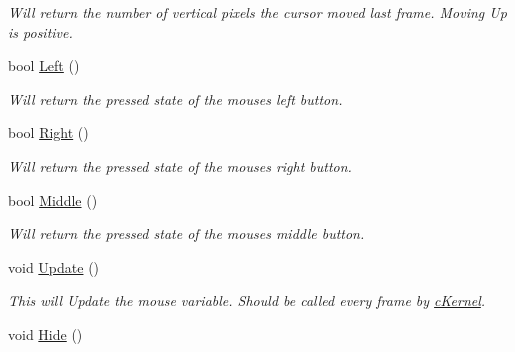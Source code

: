 \begin{DoxyCompactItemize}
\begin{DoxyCompactList}\small\item\em Will return the number of vertical pixels the cursor moved last frame. Moving Up is positive. \end{DoxyCompactList}\item 
\hypertarget{classc_mouse_a0f6cd75cafc7c7ff7f00947e2f98b092}{
bool \hyperlink{classc_mouse_a0f6cd75cafc7c7ff7f00947e2f98b092}{Left} ()}
\label{classc_mouse_a0f6cd75cafc7c7ff7f00947e2f98b092}

\begin{DoxyCompactList}\small\item\em Will return the pressed state of the mouses left button. \end{DoxyCompactList}\item 
\hypertarget{classc_mouse_a4d84d97d051d920a476e5b300fc38396}{
bool \hyperlink{classc_mouse_a4d84d97d051d920a476e5b300fc38396}{Right} ()}
\label{classc_mouse_a4d84d97d051d920a476e5b300fc38396}

\begin{DoxyCompactList}\small\item\em Will return the pressed state of the mouses right button. \end{DoxyCompactList}\item 
\hypertarget{classc_mouse_ae372f0b8e20928233060adc9a7450a93}{
bool \hyperlink{classc_mouse_ae372f0b8e20928233060adc9a7450a93}{Middle} ()}
\label{classc_mouse_ae372f0b8e20928233060adc9a7450a93}

\begin{DoxyCompactList}\small\item\em Will return the pressed state of the mouses middle button. \end{DoxyCompactList}\item 
\hypertarget{classc_mouse_a558d192a5c2df1352d1b8de7275a9359}{
void \hyperlink{classc_mouse_a558d192a5c2df1352d1b8de7275a9359}{Update} ()}
\label{classc_mouse_a558d192a5c2df1352d1b8de7275a9359}

\begin{DoxyCompactList}\small\item\em This will Update the mouse variable. Should be called every frame by \hyperlink{classc_kernel}{cKernel}. \end{DoxyCompactList}\item 
\hypertarget{classc_mouse_a65b10c846c3e0ac6d77f398095c66164}{
void \hyperlink{classc_mouse_a65b10c846c3e0ac6d77f398095c66164}{Hide} ()}
\label{classc_mouse_a65b10c846c3e0ac6d77f398095c66164}


\end{DoxyCompactItemize}
